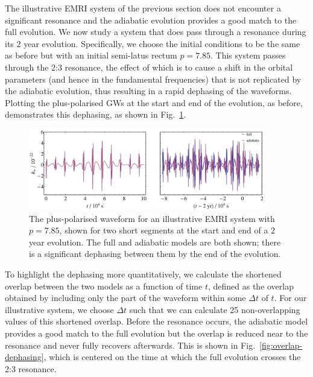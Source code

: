 \documentclass[aps,prd,amsfonts,amssymb,amsmath,nofootinbib,reprint,showpacs,superscriptaddress,twocolumn]{revtex4}
\newcommand{\figref}[1]{Fig.\ \ref{fig:#1}}
\begin{document}
The illustrative EMRI system of the previous section does not encounter a significant resonance and the adiabatic evolution provides a good match to the full evolution. We now study a system that does pass through a resonance during its $2$ year evolution. Specifically, we choose the initial conditions to be the same as before but with an initial semi-latus rectum $p=7.85$. This system passes through the 2:3 resonance, the effect of which is to cause a shift in the orbital parameters (and hence in the fundamental frequencies) that is not replicated by the adiabatic evolution, thus resulting in a rapid dephasing of the waveforms. Plotting the plus-polarised GWs at the start and end of the evolution, as before, demonstrates this dephasing, as shown in \figref{dephased-waveform}.

\begin{figure}[htbp]
\centering
\includegraphics[width=0.92\textwidth]{Fig_dephased_waveform}
\caption{\label{fig:dephased-waveform}The plus-polarised waveform for an illustrative EMRI system with $p=7.85$, shown for two short segments at the start and end of a $2$ year evolution. The full and adiabatic models are both shown; there is a significant dephasing between them by the end of the evolution.}
\end{figure}

To highlight the dephasing more quantitatively, we calculate the shortened overlap between the two models as a function of time $t$, defined as the overlap obtained by including only the part of the waveform within some $\Delta t$ of $t$. For our illustrative system, we choose $\Delta t$ such that we can calculate 25 non-overlapping values of this shortened overlap. Before the resonance occurs, the adiabatic model provides a good match to the full evolution but the overlap is reduced near to the resonance and never fully recovers afterwards. This is shown in \figref{overlap-dephasing}, which is centered on the time at which the full evolution crosses the 2:3 resonance.
\end{document}
